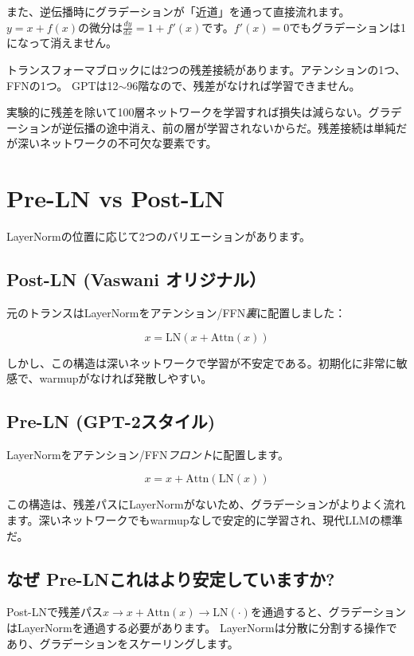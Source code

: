また、逆伝播時にグラデーションが「近道」を通って直接流れます。$y = x + f(x)$の微分は$\frac{dy}{dx} = 1 + f'(x)$です。$f'(x) = 0$でもグラデーションは1になって消えません。

トランスフォーマブロックには2つの残差接続があります。アテンションの1つ、FFNの1つ。 GPTは12$\sim$96階なので、残差がなければ学習できません。

\begin{warnbox}
実験的に残差を除いて100層ネットワークを学習すれば損失は減らない。グラデーションが逆伝播の途中消え、前の層が学習されないからだ。残差接続は単純だが深いネットワークの不可欠な要素です。
\end{warnbox}

\section{Pre-LN vs Post-LN}

LayerNormの位置に応じて2つのバリエーションがあります。

\subsection{Post-LN (Vaswani オリジナル）}

元のトランスはLayerNormをアテンション/FFN\emph{裏}に配置しました：

\[
x = \text{LN}(x + \text{Attn}(x))
\]

しかし、この構造は深いネットワークで学習が不安定である。初期化に非常に敏感で、warmupがなければ発散しやすい。

\subsection{Pre-LN (GPT-2スタイル)}

LayerNormをアテンション/FFN\emph{フロント}に配置します。

\[
x = x + \text{Attn}(\text{LN}(x))
\]

この構造は、残差パスにLayerNormがないため、グラデーションがよりよく流れます。深いネットワークでもwarmupなしで安定的に学習され、現代LLMの標準だ。

\subsection{なぜ Pre-LNこれはより安定していますか?}

Post-LNで残差パス$x \to x + \text{Attn}(x) \to \text{LN}(\cdot)$を通過すると、グラデーションはLayerNormを通過する必要があります。 LayerNormは分散に分割する操作であり、グラデーションをスケーリングします。

